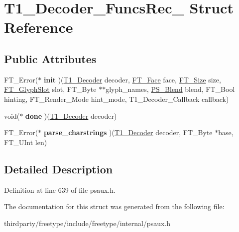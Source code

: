 \hypertarget{struct_t1___decoder___funcs_rec__}{}\section{T1\+\_\+\+Decoder\+\_\+\+Funcs\+Rec\+\_\+ Struct Reference}
\label{struct_t1___decoder___funcs_rec__}
\subsection*{Public Attributes}
\begin{DoxyCompactItemize}
\item 
\mbox{\label{struct_t1___decoder___funcs_rec___ac6c6d5e56e3413bdb3802668e4ce3de7}} 
F\+T\+\_\+\+Error($\ast$ {\bfseries init} )(\hyperlink{struct_t1___decoder_rec__}{T1\+\_\+\+Decoder} decoder, \hyperlink{struct_f_t___face_rec__}{F\+T\+\_\+\+Face} face, \hyperlink{struct_f_t___size_rec__}{F\+T\+\_\+\+Size} size, \hyperlink{struct_f_t___glyph_slot_rec__}{F\+T\+\_\+\+Glyph\+Slot} slot, F\+T\+\_\+\+Byte $\ast$$\ast$glyph\+\_\+names, \hyperlink{struct_p_s___blend_rec__}{P\+S\+\_\+\+Blend} blend, F\+T\+\_\+\+Bool hinting, F\+T\+\_\+\+Render\+\_\+\+Mode hint\+\_\+mode, T1\+\_\+\+Decoder\+\_\+\+Callback callback)
\item 
\mbox{\label{struct_t1___decoder___funcs_rec___a766b605fd0a10755d9ce14d2bfea3bc5}} 
void($\ast$ {\bfseries done} )(\hyperlink{struct_t1___decoder_rec__}{T1\+\_\+\+Decoder} decoder)
\item 
\mbox{\label{struct_t1___decoder___funcs_rec___acef414b0ecbec6da63a11c1d94fb7c3e}} 
F\+T\+\_\+\+Error($\ast$ {\bfseries parse\+\_\+charstrings} )(\hyperlink{struct_t1___decoder_rec__}{T1\+\_\+\+Decoder} decoder, F\+T\+\_\+\+Byte $\ast$base, F\+T\+\_\+\+U\+Int len)
\end{DoxyCompactItemize}


\subsection{Detailed Description}


Definition at line 639 of file psaux.\+h.



The documentation for this struct was generated from the following file\+:\begin{DoxyCompactItemize}
\item 
thirdparty/freetype/include/freetype/internal/psaux.\+h\end{DoxyCompactItemize}
